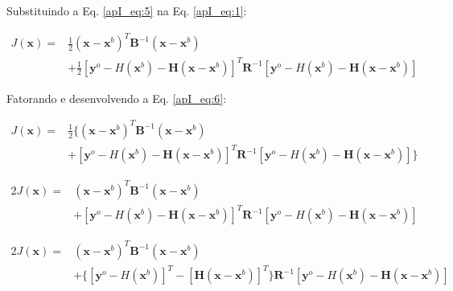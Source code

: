 Substituindo a Eq. \ref{apI_eq:5} na Eq. \ref{apI_eq:1}:

\begin{equation}
  \label{apI_eq:6}
  \begin{aligned}
  J(\mathbf{x}) = {} & \frac{1}{2}(\mathbf{x} - \mathbf{x}^{b})^{T}\mathbf{B}^{-1}(\mathbf{x} - \mathbf{x}^{b}) \\
  & + \frac{1}{2}[\mathbf{y}^{o} - \textit{H}(\mathbf{x}^{b}) - \mathbf{H}(\mathbf{x} - \mathbf{x}^{b})]^{T}\mathbf{R}^{-1}[\mathbf{y}^{o} - \textit{H}(\mathbf{x}^{b}) - \mathbf{H}(\mathbf{x} - \mathbf{x}^{b})]
  \end{aligned}
\end{equation}

Fatorando e desenvolvendo a Eq. \ref{apI_eq:6}:

\begin{equation}
  \label{apI_eq:7}
  \begin{aligned}
    J(\mathbf{x}) = {} & \frac{1}{2}\lbrace(\mathbf{x} - \mathbf{x}^{b})^{T}\mathbf{B}^{-1}(\mathbf{x} - \mathbf{x}^{b}) \\
               & + [\mathbf{y}^{o} - \textit{H}(\mathbf{x}^{b}) - \mathbf{H}(\mathbf{x} - \mathbf{x}^{b})]^{T}\mathbf{R}^{-1}[\mathbf{y}^{o} - \textit{H}(\mathbf{x}^{b}) - \mathbf{H}(\mathbf{x} - \mathbf{x}^{b})]\rbrace
  \end{aligned}
\end{equation}

\begin{equation}
  \label{apI_eq:8}
  \begin{aligned}
    2J(\mathbf{x}) = {} & (\mathbf{x} - \mathbf{x}^{b})^{T}\mathbf{B}^{-1}(\mathbf{x} - \mathbf{x}^{b}) \\
    & + [\mathbf{y}^{o} - \textit{H}(\mathbf{x}^{b}) - \mathbf{H}(\mathbf{x} - \mathbf{x}^{b})]^{T}\mathbf{R}^{-1}[\mathbf{y}^{o} - \textit{H}(\mathbf{x}^{b}) - \mathbf{H}(\mathbf{x} - \mathbf{x}^{b})]
  \end{aligned}
\end{equation}

\begin{equation}
  \label{apI_eq:9}
  \begin{aligned}
    2J(\mathbf{x}) = {} & (\mathbf{x} - \mathbf{x}^{b})^{T}\mathbf{B}^{-1}(\mathbf{x} - \mathbf{x}^{b}) \\
    & + \lbrace{[\mathbf{y}^{o} - \textit{H}(\mathbf{x}^{b})]^{T} - [\mathbf{H}(\mathbf{x} - \mathbf{x}^{b})]^{T}\rbrace}\mathbf{R}^{-1}[\mathbf{y}^{o} - \textit{H}(\mathbf{x}^{b}) - \mathbf{H}(\mathbf{x} - \mathbf{x}^{b})]
  \end{aligned}
\end{equation}

